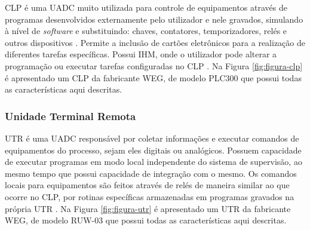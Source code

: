        \gls{CLP} é uma \gls{UADC} muito utilizada para controle de equipamentos através de programas desenvolvidos externamente pelo utilizador e nele gravados, simulando à nível de \textit{software} e substituindo: chaves, contatores, temporizadores, relés e outros dispositivos \cite{CLPManual}. Permite a inclusão de cartões eletrônicos para a realização de diferentes tarefas específicas. Possui \gls{IHM}, onde o utilizador pode alterar a programação ou executar tarefas configuradas no \gls{CLP} \cite{mamede-instalacoes}. Na Figura \ref{fig:figura-clp} é apresentado um \gls{CLP} da fabricante WEG, de modelo PLC300 que possui todas as características aqui descritas.
       
        \begin{figure}[!h]
	    \end{figure}
	    
    \subsubsection{Unidade Terminal Remota}
    \label{sec:utr}

       \gls{UTR} é uma \gls{UADC} responsável por coletar informações e executar comandos de equipamentos do processo, sejam eles digitais ou analógicos. Possuem capacidade de executar programas em modo local independente do sistema de supervisão, ao mesmo tempo que possui capacidade de integração com o mesmo. Os comandos locais para equipamentos são feitos através de relés de maneira similar ao que ocorre no \gls{CLP}, por rotinas específicas armazenadas em programas gravados na própria \gls{UTR} \cite{mamede-instalacoes}. Na Figura \ref{fig:figura-utr} é apresentado um \gls{UTR} da fabricante WEG, de modelo RUW-03 que possui todas as características aqui descritas.
       
